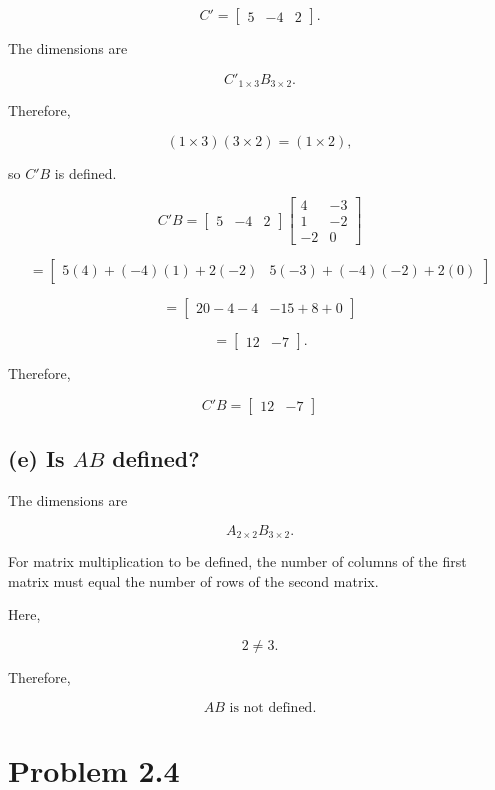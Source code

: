 \documentclass[12pt]{article}
\begin{document}
	\[
	C'
	=
	\begin{bmatrix}
		5 & -4 & 2
	\end{bmatrix}.
	\]
	
	The dimensions are
	
	\[
	C'_{1\times3}B_{3\times2}.
	\]
	
	Therefore,
	
	\[
	(1\times3)(3\times2)=(1\times2),
	\]
	
	so $C'B$ is defined.
	
	\[
	C'B
	=
	\begin{bmatrix}
		5 & -4 & 2
	\end{bmatrix}
	\begin{bmatrix}
		4 & -3\\
		1 & -2\\
		-2 & 0
	\end{bmatrix}
	\]
	
	\[
	=
	\begin{bmatrix}
		5(4)+(-4)(1)+2(-2)
		&
		5(-3)+(-4)(-2)+2(0)
	\end{bmatrix}
	\]
	
	\[
	=
	\begin{bmatrix}
		20-4-4 &
		-15+8+0
	\end{bmatrix}
	\]
	
	\[
	=
	\begin{bmatrix}
		12 & -7
	\end{bmatrix}.
	\]
	
	Therefore,
	
	\[
	\boxed{
		C'B =
		\begin{bmatrix}
			12 & -7
	\end{bmatrix}}
	\]
	
	\subsection*{(e) Is $AB$ defined?}
	
	The dimensions are
	
	\[
	A_{2\times2}B_{3\times2}.
	\]
	
	For matrix multiplication to be defined, the number of columns
	of the first matrix must equal the number of rows of the second matrix.
	
	Here,
	
	\[
	2 \neq 3.
	\]
	
	Therefore,
	
	\[
	\boxed{AB\text{ is not defined.}}
	\]
	
	\section*{Problem 2.4}
	
\end{document}
